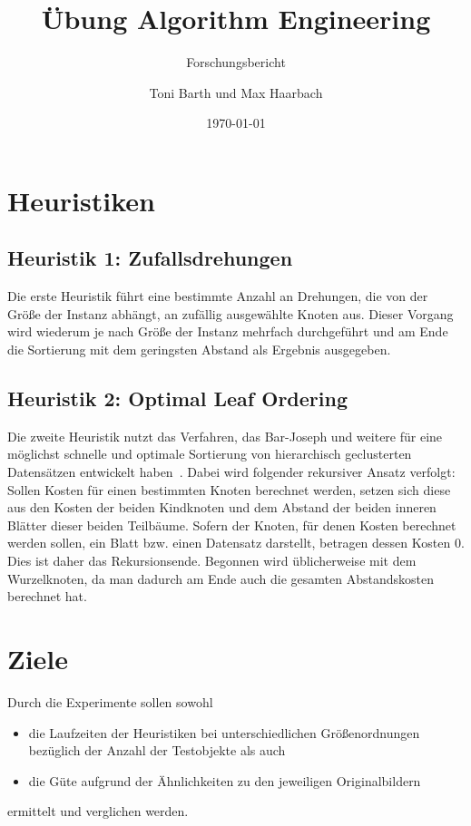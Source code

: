 \documentclass[a4paper, 10pt, twoside, onecolumn, parskip]{scrartcl}
\title{Übung Algorithm Engineering} %
\subtitle{Forschungsbericht}
\author{{Toni Barth} und {Max Haarbach}} %
\date{\today}            %
\begin{document}
    \maketitle                %

    \section{Heuristiken} \label{sec:heuristiken}

    \subsection{Heuristik 1: Zufallsdrehungen} \label{subsec:heuristic1}

    Die erste Heuristik führt eine bestimmte Anzahl an Drehungen, die von der Größe der Instanz abhängt, an zufällig ausgewählte Knoten aus.
    Dieser Vorgang wird wiederum je nach Größe der Instanz mehrfach durchgeführt und am Ende die Sortierung mit dem geringsten Abstand als Ergebnis ausgegeben.

    \subsection{Heuristik 2: Optimal Leaf Ordering} \label{subsec:heuristic2}

    Die zweite Heuristik nutzt das Verfahren, das Bar-Joseph und weitere für eine möglichst schnelle und optimale Sortierung von hierarchisch geclusterten Datensätzen entwickelt haben~\cite{bar2001fast}.
    Dabei wird folgender rekursiver Ansatz verfolgt:
    Sollen Kosten für einen bestimmten Knoten berechnet werden, setzen sich diese aus den Kosten der beiden Kindknoten und dem Abstand der beiden inneren Blätter dieser beiden Teilbäume.
    Sofern der Knoten, für denen Kosten berechnet werden sollen, ein Blatt bzw. einen Datensatz darstellt, betragen dessen Kosten $0$.
    Dies ist daher das Rekursionsende.
    Begonnen wird üblicherweise mit dem Wurzelknoten, da man dadurch am Ende auch die gesamten Abstandskosten berechnet hat.

    \section{Ziele} \label{sec:ziele}

    Durch die Experimente sollen sowohl
    \begin{itemize}
        \item die Laufzeiten der Heuristiken bei unterschiedlichen Größenordnungen bezüglich der Anzahl der Testobjekte als auch
        \item die Güte aufgrund der Ähnlichkeiten zu den jeweiligen Originalbildern
    \end{itemize}
    ermittelt und verglichen werden.
\end{document}
